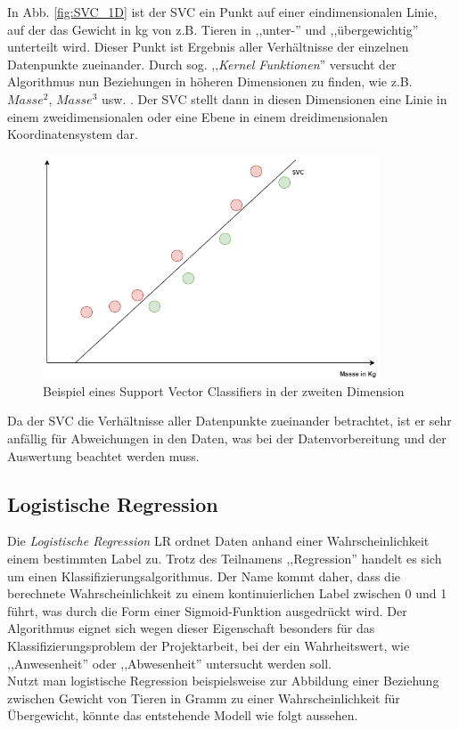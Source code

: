 In Abb. \ref{fig:SVC_1D} ist der SVC ein Punkt auf einer eindimensionalen Linie, auf der das Gewicht in kg von z.B. 
Tieren in ,,unter-'' und ,,übergewichtig'' unterteilt wird. Dieser Punkt ist Ergebnis aller Verhältnisse der einzelnen
Datenpunkte zueinander. Durch sog. ,,\textit{Kernel Funktionen}'' versucht der Algorithmus nun Beziehungen 
in höheren Dimensionen zu finden, wie z.B. $Masse^2$, $Masse^3$ usw. . Der SVC stellt dann in diesen Dimensionen 
eine Linie in einem zweidimensionalen oder eine Ebene in einem dreidimensionalen Koordinatensystem dar.\\

\begin{figure}[h]
    \centering
    \includegraphics[width=10.0cm]{pic/SVC_2D.png}
    \caption{Beispiel eines Support Vector Classifiers in der zweiten Dimension}
    \label{fig:SVC_2D}
\end{figure}

Da der SVC die Verhältnisse aller Datenpunkte zueinander betrachtet, ist er sehr anfällig für Abweichungen in 
den Daten, was bei der Datenvorbereitung und der Auswertung beachtet werden muss.

\newpage
\subsection{Logistische Regression}

Die \textit{Logistische Regression} LR ordnet Daten anhand einer Wahrscheinlichkeit einem bestimmten Label  zu. Trotz des Teilnamens
,,Regression'' handelt es sich um einen Klassifizierungsalgorithmus. Der Name kommt daher, dass die berechnete Wahrscheinlichkeit
zu einem kontinuierlichen Label zwischen 0 und 1 führt, was durch die Form einer Sigmoid-Funktion ausgedrückt wird.
Der Algorithmus eignet sich wegen dieser Eigenschaft besonders für  das Klassifizierungsproblem der Projektarbeit, 
bei der ein Wahrheitswert, wie ,,Anwesenheit'' oder ,,Abwesenheit'' untersucht werden soll.\\
Nutzt man logistische Regression beispielsweise zur Abbildung einer Beziehung zwischen Gewicht von Tieren in Gramm 
zu einer Wahrscheinlichkeit für Übergewicht, könnte das entstehende Modell wie folgt aussehen.

